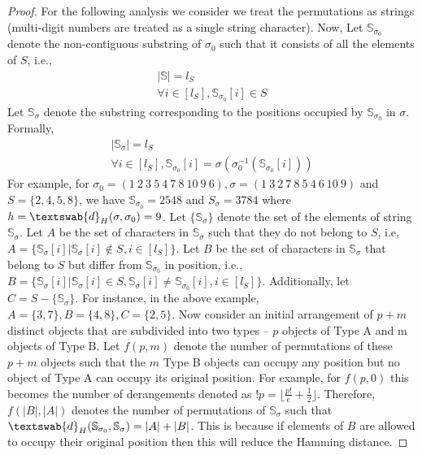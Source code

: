 \begin{proof}
For the following analysis we consider we treat the permutations as strings (multi-digit numbers are treated as a single string character). Now,   
 Let $\mathbb{S}_{\sigma_0}$ denote the non-contiguous substring of $\sigma_0$ such that it consists of all the  elements of $S$, i.e., \begin{gather}|\mathbb{S}|=l_S\\
 \forall i \in [l_S], \mathbb{S}_{\sigma_0}[i] \in S \end{gather}  Let $\mathbb{S}_{\sigma}$ denote the substring corresponding to the positions occupied by $\mathbb{S}_{\sigma_0}$ in $\sigma$. Formally,
 \begin{gather}|\mathbb{S}_{\sigma}|=l_S\\
 \forall i \in [l_S], \mathbb{S}_{\sigma_0}[i] = \sigma(\sigma_0^{-1}(\mathbb{S}_{\sigma_0}[i])) \end{gather}  For example, for $\sigma_0=(1\:2\:3\:5\:4\:7\:8\:10\:9\:6), \sigma=(1\:3\:2\:7\:8\:5\:4\:6\:10\:9)$ and $S=\{2,4,5,8\}$, we have $\mathbb{S}_{\sigma_0}=2548$ and $S_{\sigma}=3784$ where $h=\textswab{d}_H(\sigma,\sigma_0)=9$.  Let $\{\mathbb{S}_{\sigma}\}$ denote the set of the elements of string $\mathbb{S}_{\sigma}$.
 Let $A$ be the set of characters in  $\mathbb{S}_{\sigma}$ such that they do not belong to $S$, i.e, $A=\{\mathbb{S}_{\sigma}[i]|\mathbb{S}_{\sigma}[i] \not \in S, i \in [l_S]\}$. Let $B$ be the set of characters in $\mathbb{S}_{\sigma}$ that belong to $S$ but differ from $\mathbb{S}_{\sigma_0}$ in position, i.e., $B=\{\mathbb{S}_{\sigma}[i]|\mathbb{S}_{\sigma}[i] \in S, \mathbb{S}_{\sigma}[i]\neq \mathbb{S}_{\sigma_0}[i], i \in [l_S]\}$. Additionally, let $C=S-\{\mathbb{S}_{\sigma}\}$. For instance, in the above example, $A=\{3,7\}, B=\{4,8\}, C=\{2,5\}$. Now consider  an initial arrangement of $p+m$ distinct objects that are subdivided into two types -- $p$ objects of Type A and m objects of Type B. Let $f(p,m)$ denote the number of permutations of these $p+m$ objects such that the $m$ Type B objects can occupy any position but no object of Type A can occupy its original position. For example, for $f(p,0)$ this becomes the number of derangements \cite{derangement} denoted as $!p=\lfloor \frac{p!}{e} +\frac{1}{2} \rfloor$. Therefore, $f(|B|,|A|)$ denotes the number of permutations of $\mathbb{S}_\sigma$ such that $\textswab{d}_H(\mathbb{S}_{\sigma_0},\mathbb{S}_{\sigma})=|A|+|B|$. This is because if elements of $B$ are allowed to occupy their original position then this will reduce the Hamming distance.  

\end{proof}
